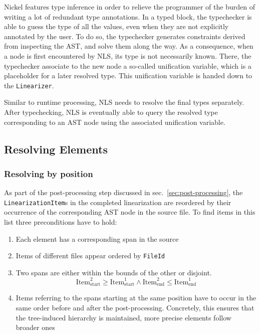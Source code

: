 \documentclass[
  a4paper,
  bibtex,
  english,
  nomenclature]{kthlatex/kththesis/kththesis}
\providecommand{\tightlist}{%
  \setlength{\itemsep}{0pt}\setlength{\parskip}{0pt}}
\begin{document}
Nickel features type inference in order to relieve the programmer of the
burden of writing a lot of redundant type annotations. In a typed block,
the typechecker is able to guess the type of all the values, even when
they are not explicitly annotated by the user. To do so, the typechecker
generates constraints derived from inspecting the AST, and solve them
along the way. As a consequence, when a node is first encountered by
NLS, its type is not necessarily known. There, the typechecker associate
to the new node a so-called unification variable, which is a placeholder
for a later resolved type. This unification variable is handed down to
the \texttt{Linearizer}.

Similar to runtime processing, NLS needs to resolve the final types
separately. After typechecking, NLS is eventually able to query the
resolved type corresponding to an AST node using the associated
unification variable.

\hypertarget{sec:resolving-elements}{%
\subsection{Resolving Elements}\label{sec:resolving-elements}}

\hypertarget{sec:resolving-by-position}{%
\subsubsection{Resolving by position}\label{sec:resolving-by-position}}

As part of the post-processing step discussed in
sec.~\ref{sec:post-processing}, the \texttt{LinearizationItem}s in the
completed linearization are reordered by their occurrence of the
corresponding AST node in the source file. To find items in this list
three preconditions have to hold:

\begin{enumerate}
\def\labelenumi{\arabic{enumi}.}
\tightlist
\item
  Each element has a corresponding span in the source
\item
  Items of different files appear ordered by \texttt{FileId}
\item
  Two spans are either within the bounds of the other or disjoint.
  \[\text{Item}^2_\text{start} \geq \text{Item}^1_\text{start} \land \text{Item}^2_\text{end} \leq \text{Item}^1_\text{end}\]
\item
  Items referring to the spans starting at the same position have to
  occur in the same order before and after the post-processing.
  Concretely, this ensures that the tree-induced hierarchy is
  maintained, more precise elements follow broader ones
\end{enumerate}
\end{document}
